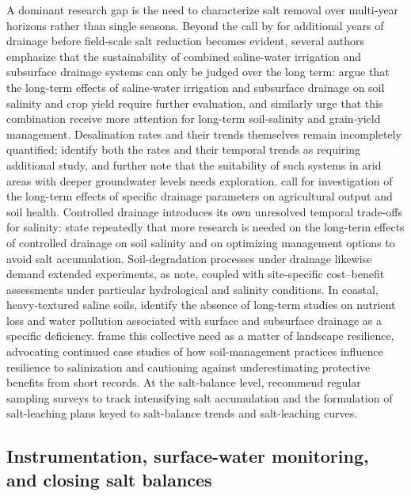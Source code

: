 \documentclass[11pt]{article}
\begin{document}
A dominant research gap is the need to characterize salt removal over multi-year horizons rather than single seasons. Beyond the call by \textcite{Almen2021} for additional years of drainage before field-scale salt reduction becomes evident, several authors emphasize that the sustainability of combined saline-water irrigation and subsurface drainage systems can only be judged over the long term: \textcite{Feng2017} argue that the long-term effects of saline-water irrigation and subsurface drainage on soil salinity and crop yield require further evaluation, and \textcite{Feng2021} similarly urge that this combination receive more attention for long-term soil-salinity and grain-yield management. Desalination rates and their trends themselves remain incompletely quantified; \textcite{Guo2024b} identify both the rates and their temporal trends as requiring additional study, and further note that the suitability of such systems in arid areas with deeper groundwater levels needs exploration. \textcite{Yao2024} call for investigation of the long-term effects of specific drainage parameters on agricultural output and soil health. Controlled drainage introduces its own unresolved temporal trade-offs for salinity: \textcite{Jouni2018} state repeatedly that more research is needed on the long-term effects of controlled drainage on soil salinity and on optimizing management options to avoid salt accumulation. Soil-degradation processes under drainage likewise demand extended experiments, as \textcite{Lu2019} note, coupled with site-specific cost--benefit assessments under particular hydrological and salinity conditions. In coastal, heavy-textured saline soils, \textcite{Islam2025} identify the absence of long-term studies on nutrient loss and water pollution associated with surface and subsurface drainage as a specific deficiency. \textcite{Daigh2025} frame this collective need as a matter of landscape resilience, advocating continued case studies of how soil-management practices influence resilience to salinization and cautioning against underestimating protective benefits from short records. At the salt-balance level, \textcite{Heng2021} recommend regular sampling surveys to track intensifying salt accumulation and the formulation of salt-leaching plans keyed to salt-balance trends and salt-leaching curves.

\subsection{Instrumentation, surface-water monitoring, and closing salt balances}
\end{document}
